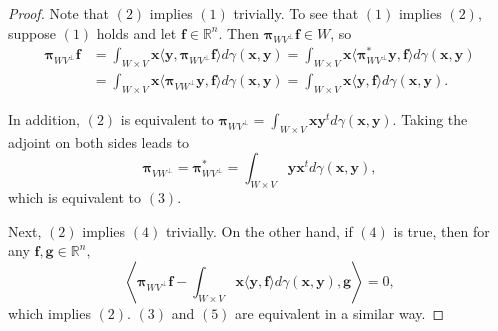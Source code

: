 \documentclass{amsart}
\numberwithin{equation}{section}
\newcommand{\bpi}{{\boldsymbol{\pi}}}
\theoremstyle{plain}
\theoremstyle{remark}
\theoremstyle{definition}
\begin{document}
\begin{proof}
Note that  $(2)$ implies $(1)$ trivially. To see that $(1)$ implies $(2)$, suppose $(1)$ holds and let $\textbf{f} \in \mathbb{R}^n$. Then $\bpi_{WV^\perp}\mathbf{f} \in W$, so 
    \begin{equation*}
    \begin{split}
        \bpi_{WV^\perp}\mathbf{f} &= \int_{W \times V} \mathbf{x} \langle \mathbf{y}, \bpi_{WV^\perp} \mathbf{f} \rangle d\gamma(\mathbf{x}, \mathbf{y}) = \int_{W \times V} \mathbf{x} \langle \bpi_{WV^\perp}^* \mathbf{y},  \mathbf{f} \rangle d\gamma(\mathbf{x}, \mathbf{y}) \\
        &= \int_{W \times V} \mathbf{x} \langle \bpi_{VW^\perp} \mathbf{y},  \mathbf{f} \rangle d\gamma(\mathbf{x}, \mathbf{y}) = \int_{W \times V} \mathbf{x} \langle \mathbf{y},  \mathbf{f} \rangle d\gamma(\mathbf{x}, \mathbf{y}).
    \end{split}
    \end{equation*}
    
In addition, $(2)$ is equivalent to $ \bpi_{WV^\perp} = \int_{W \times V} \mathbf{x} \mathbf{y}^t d\gamma(\mathbf{x}, \mathbf{y})$. 
Taking the adjoint on both sides leads to 
\begin{equation*}
       \bpi_{VW^\perp} = \bpi_{WV^\perp}^* = \int_{W \times V} \mathbf{y} \mathbf{x}^t d\gamma(\mathbf{x}, \mathbf{y}),
    \end{equation*}
which is equivalent to $(3)$. 

Next, $(2)$ implies $(4)$ trivially. On the other hand, if $(4)$ is true, then for any $\mathbf{f}, \mathbf{g} \in \mathbb{R}^n, $
\begin{equation*}
    \left\langle  \bpi_{WV^\perp}\mathbf{f} - \int_{W \times V} \mathbf{x} \langle \mathbf{y}, \mathbf{f} \rangle d\gamma(\mathbf{x}, \mathbf{y}) , \mathbf{g} \right\rangle = 0, 
\end{equation*}
which implies $(2)$. $(3)$ and $(5)$ are equivalent in a similar way. 


\end{proof}
\end{document}
